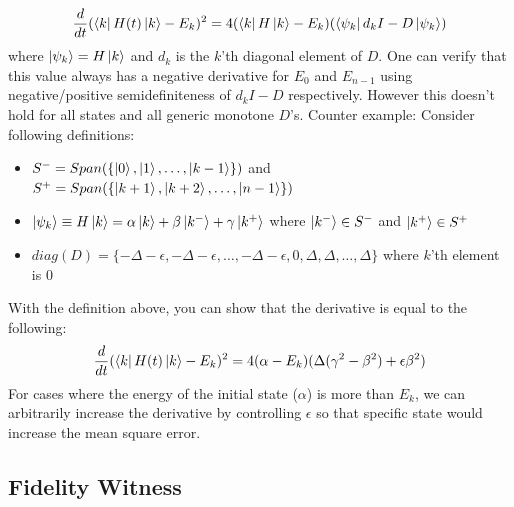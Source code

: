 \documentclass[11pt]{article}
\begin{document}
$$
\frac{d}{dt}(\bra{k} H(t) \ket{k} - E_k)^2 = 4(\bra{k} H \ket{k} - E_k)(\bra{\psi_k} d_kI - D \ket{\psi_k})
$$
where $\ket{\psi_k} = H\ket{k}$ and $d_k$ is the $k$'th diagonal element of $D$. One can verify that this value always has a negative derivative for $E_0$ and $E_{n-1}$ using negative/positive semidefiniteness of $d_kI - D$ respectively. However this doesn't hold for all states and all generic monotone $D$'s. Counter example:
Consider following definitions:
\begin{itemize}
    \item $S^- = Span(\{\ket{0}, \ket{1}, \dots, \ket{k-1}\})$ and $S^+ = Span(\{\ket{k+1}, \ket{k+2}, \dots, \ket{n-1}\})$
    \item $\ket{\psi_k} \equiv H\ket{k} = \alpha\ket{k} + \beta\ket{k^-} + \gamma\ket{k^+}$ where $\ket{k^-} \in S^-$ and $\ket{k^+} \in S^+$
    \item $diag(D) = \{-\Delta - \epsilon, -\Delta - \epsilon, \dots, -\Delta - \epsilon, 0, \Delta, \Delta, \dots, \Delta \}$ where $k$'th element is $0$
\end{itemize}
With the definition above, you can show that the derivative is equal to the following:
$$
\frac{d}{dt}(\bra{k} H(t) \ket{k} - E_k)^2 = 4(\alpha - E_k)(\Delta(\gamma^2 - \beta^2) + \epsilon \beta^2)
$$
For cases where the energy of the initial state ($\alpha$) is more than $E_k$, we can arbitrarily increase the derivative by controlling $\epsilon$ so that specific state would increase the mean square error.


\subsection{Fidelity Witness}
\end{document}
